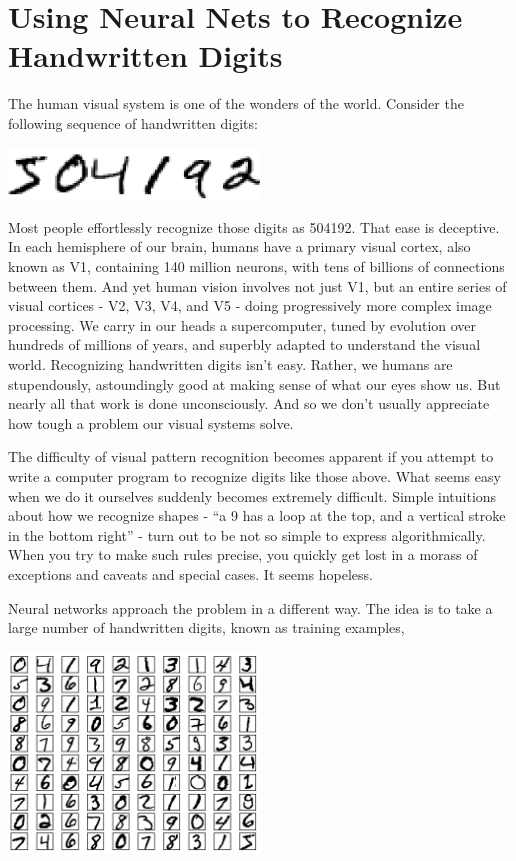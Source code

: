 


\chapter{Using Neural Nets to Recognize Handwritten Digits}
\label{sec:UsingNeuralNetsTorRcognizeHandWrittenDigits}


The human visual system is one of the wonders of the world. Consider the following sequence of handwritten digits: 

{\centering
\includegraphics[width=0.5\textwidth,]{pic/504192}
\par}

Most people effortlessly recognize those digits as 504192. That ease is deceptive. In each hemisphere of our brain, humans have a primary visual cortex, also known as V1, containing 140 million neurons, with tens of billions of connections between them. And yet human vision involves not just V1, but an entire series of visual cortices - V2, V3, V4, and V5 - doing progressively more complex image processing. We carry in our heads a supercomputer, tuned by evolution over hundreds of millions of years, and superbly adapted to understand the visual world. Recognizing handwritten digits isn't easy. Rather, we humans are stupendously, astoundingly good at making sense of what our eyes show us. But nearly all that work is done unconsciously. And so we don't usually appreciate how tough a problem our visual systems solve.

The difficulty of visual pattern recognition becomes apparent if you attempt to write a computer program to recognize digits like those above. What seems easy when we do it ourselves suddenly becomes extremely difficult. Simple intuitions about how we recognize shapes - ``a 9 has a loop at the top, and a vertical stroke in the bottom right'' - turn out to be not so simple to express algorithmically. When you try to make such rules precise, you quickly get lost in a morass of exceptions and caveats and special cases. It seems hopeless.

Neural networks approach the problem in a different way. The idea is to take a large number of handwritten digits, known as training examples,

{\centering
\includegraphics[width=0.5\textwidth,]{pic/gridnumbers}
\par}


